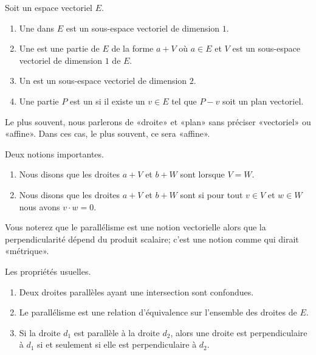 \begin{definition}      \label{DEFooTQIFooKcloeY}
	Soit un espace vectoriel \( E\).
	\begin{enumerate}
		\item
		      Une  dans \( E\) est un sous-espace vectoriel de dimension \( 1\).
		\item
		      Une  est une partie de \( E\) de la forme \( a+V\) où \( a\in E\) et \( V\) est un sous-espace vectoriel de dimension \( 1\) de \( E\).
		\item
		      Un  est un sous-espace vectoriel de dimension \( 2\).
		\item
		      Une partie \( P\) est un  si il existe un \( v\in E\) tel que \( P-v\) soit un plan vectoriel.
	\end{enumerate}
	Le plus souvent, nous parlerons de «droite» et «plan» sans préciser «vectoriel» ou «affine». Dans ces cas, le plus souvent, ce sera «affine».
\end{definition}

\begin{definition}
	Deux notions importantes.
	\begin{enumerate}
		\item
		      Nous disons que les droites \( a+V\) et \( b+W\) sont  lorsque \( V=W\).
		\item
		      Nous disons que les droites \( a+V\) et \( b+W\) sont  si pour tout \( v\in V\) et \( w\in W\) nous avons \( v\cdot w=0\).
	\end{enumerate}
	Vous noterez que le parallélisme est une notion vectorielle alors que la perpendicularité dépend du produit scalaire; c'est une notion comme qui dirait «métrique».
\end{definition}

\begin{proposition}     \label{PROPooADJNooMyXUxG}
	Les propriétés usuelles.
	\begin{enumerate}
		\item
		      Deux droites parallèles ayant une intersection sont confondues.
		\item
		      Le parallélisme est une relation d'équivalence sur l'ensemble des droites de \( E\).
		\item
		      Si la droite \( d_1\) est parallèle à la droite \( d_2\), alors une droite est perpendiculaire à \( d_1\) si et seulement si elle est perpendiculaire à \( d_2\).
	\end{enumerate}
\end{proposition}

